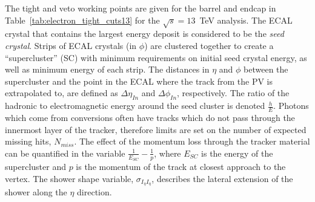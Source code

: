 The tight and veto working points are given for the barrel and endcap in Table~\ref{tab:electron_tight_cuts13} for the $\sqrt{s}=13$~TeV analysis. The ECAL crystal that contains the largest energy deposit is considered to be the \emph{seed crystal}. Strips of ECAL crystals (in $\phi$) are clustered together to create a ``supercluster'' (SC) with minimum requirements on initial seed crystal energy, as well as minimum energy of each strip. The distances in $\eta$ and $\phi$ between the supercluster and the point in the ECAL where the track from the PV is extrapolated to, are defined as $\Delta \eta_{In}$ and $\Delta \phi_{In}$, respectively. The ratio of the hadronic to electromagnetic energy around the seed cluster is denoted $\frac{h}{E}$. Photons which come from conversions often have tracks which do not pass through the innermost layer of the tracker, therefore limits are set on the number of expected missing hits, $N_{miss}$. The effect of the momentum loss through the tracker material can be quantified in the variable $\frac{1}{E_{SC}} - \frac{1}{p}$, where $E_{SC}$ is the energy of the supercluster and $p$ is the momentum of the track at closest approach to the vertex. The shower shape variable, $\sigma_{I_{\eta}I_{\eta}}$, describes the lateral extension of the shower along the $\eta$ direction.

